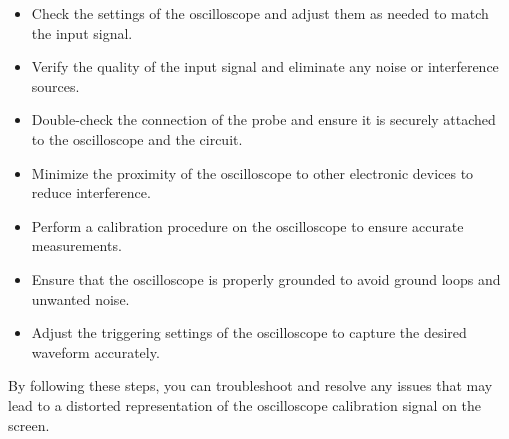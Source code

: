 \documentclass[11pt]{article}
\begin{document}
\begin{question}
{        \begin{itemize}
            \item Check the settings of the oscilloscope and adjust them as needed to match the input signal.
            \item Verify the quality of the input signal and eliminate any noise or interference sources.
            \item Double-check the connection of the probe and ensure it is securely attached to
                  the oscilloscope and the circuit.
            \item Minimize the proximity of the oscilloscope to other electronic devices to reduce interference.
            \item Perform a calibration procedure on the oscilloscope to ensure accurate measurements.
            \item Ensure that the oscilloscope is properly grounded to avoid ground loops and unwanted noise.
            \item Adjust the triggering settings of the oscilloscope to capture the desired waveform accurately.
        \end{itemize}

        By following these steps, you can troubleshoot and resolve
        any issues that may lead to a distorted representation
        of the oscilloscope calibration signal on the screen.
    }

\end{question}


\begin{question}


\end{question}

\end{document}
